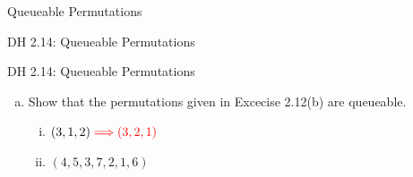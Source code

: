 \begin{frame}{}
  \centerline{\LARGE Queueable Permutations}

  \vspace{0.30cm}
\end{frame}

\begin{frame}{}
  \begin{exampleblock}{DH 2.14: Queueable Permutations}

  \end{exampleblock}
\end{frame}

\begin{frame}{}
  \begin{exampleblock}{DH 2.14: Queueable Permutations}
    \begin{enumerate}[(a)]
      \item Show that the permutations given in Excecise 2.12(b) are queueable.
	\begin{enumerate}[(i)]
	  \item $(3,1,2) \;\textcolor{red}{\Longrightarrow (3,2,1)}$
	  \item $(4,5,3,7,2,1,6)$
	\end{enumerate}
    \end{enumerate}
  \end{exampleblock}

  \vspace{0.30cm}
  \begin{columns}
    \pause
    \pause
  \end{columns}
\end{frame}

